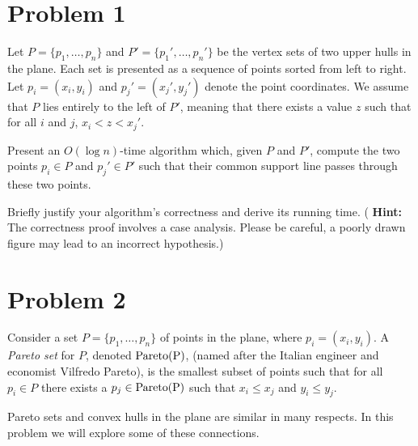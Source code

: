 \documentclass[11pt]{article}
\newcommand{\pareto}[1]{\rm{Pareto}(#1)}
\begin{document}

\newpage
\section*{Problem 1}

Let $P = \{ p_1, \ldots, p_n \}$ and $P' = \{ p_1', \ldots, p_n' \}$ be the
vertex sets of two upper hulls in the plane.  Each set is presented as a
sequence of points sorted from left to right.  Let $p_i = (x_i, y_i)$ and $p_j'
= (x_j', y_j')$ denote the point coordinates.  We assume that $P$ lies entirely
to the left of $P'$, meaning that there exists a value $z$ such that for all
$i$ and $j$, $x_i < z < x_j'$.


Present an $O(\log n)$-time algorithm which, given $P$ and $P'$, compute the two
points $p_i \in P$ and $p_j' \in P'$ such that their common support line passes
through these two points.

Briefly justify your algorithm's correctness and derive its running time.  ({\bf
Hint:} The correctness proof involves a case analysis.  Please be careful, a
poorly drawn figure may lead to an incorrect hypothesis.) \\

\answer


\newpage
\section*{Problem 2}

Consider a set $P = \{p_1, \ldots, p_n \}$ of points in the plane, where $p_i =
(x_i, y_i)$. A \emph{Pareto set} for $P$, denoted $\pareto{P}$, (named after
the Italian engineer and economist Vilfredo Pareto), is the smallest subset of points
such that for all $p_i \in P$ there exists a $p_j \in \pareto{P}$ such that $x_i \leq x_j$ and
$y_i \leq y_j$.


Pareto sets and convex hulls in the plane are similar in many respects.  In
this problem we will explore some of these connections.
\end{document}
